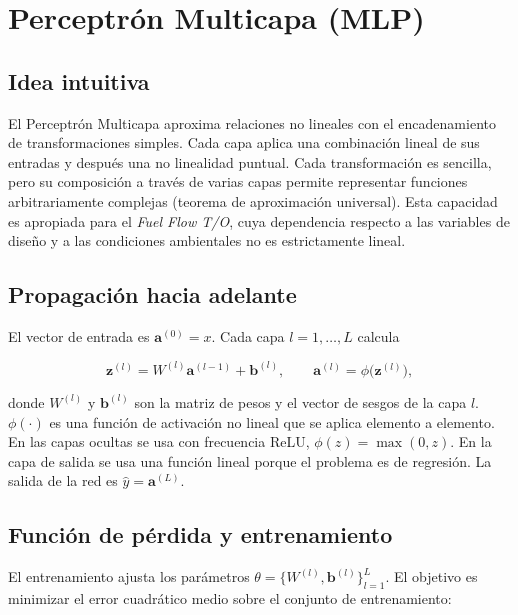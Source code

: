 \section{Perceptrón Multicapa (MLP)}
\label{sec:mlp}

\subsection{Idea intuitiva}

El Perceptrón Multicapa aproxima relaciones no lineales con el encadenamiento de transformaciones simples. Cada capa aplica una combinación lineal de sus entradas y después una no linealidad puntual. Cada transformación es sencilla, pero su composición a través de varias capas permite representar funciones arbitrariamente complejas (teorema de aproximación universal). Esta capacidad es apropiada para el \textit{Fuel Flow T/O}, cuya dependencia respecto a las variables de diseño y a las condiciones ambientales no es estrictamente lineal.

\subsection{Propagación hacia adelante}

El vector de entrada es $\mathbf{a}^{(0)}=x$. Cada capa $l=1,\dots,L$ calcula

\begin{equation}
\mathbf{z}^{(l)} = W^{(l)}\mathbf{a}^{(l-1)} + \mathbf{b}^{(l)}, \qquad \mathbf{a}^{(l)} = \phi\big(\mathbf{z}^{(l)}\big),
\label{eq:mlp_forward}
\end{equation}

donde $W^{(l)}$ y $\mathbf{b}^{(l)}$ son la matriz de pesos y el vector de sesgos de la capa $l$. $\phi(\cdot)$ es una función de activación no lineal que se aplica elemento a elemento. En las capas ocultas se usa con frecuencia ReLU, $\phi(z)=\max(0,z)$. En la capa de salida se usa una función lineal porque el problema es de regresión. La salida de la red es $\hat{y}=\mathbf{a}^{(L)}$.

\subsection{Función de pérdida y entrenamiento}

El entrenamiento ajusta los parámetros $\theta=\{W^{(l)},\mathbf{b}^{(l)}\}_{l=1}^L$. El objetivo es minimizar el error cuadrático medio sobre el conjunto de entrenamiento:

